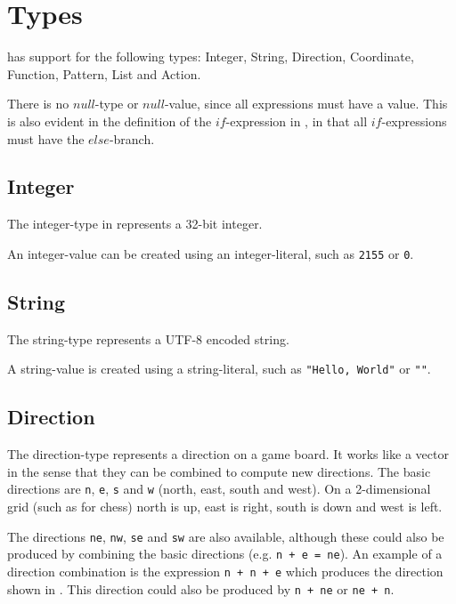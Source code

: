 \section{Types}
\label{sec:types}

\productname{} has support for the following types: Integer, String, Direction, Coordinate,
Function, Pattern, List and Action.

There is no $null$-type or $null$-value, since all expressions must have a value. This
is also evident in the definition of the $if$-expression in , in that
all $if$-expressions must have the $else$-branch.

\subsection{Integer}
The integer-type in \productname{} represents a 32-bit integer.

An integer-value can be created using an integer-literal, such as \texttt{2155} or \texttt{0}.

\subsection{String}
The string-type represents a UTF-8 encoded string.

A string-value is created using a string-literal, such as \texttt{"Hello, World"} or \texttt{""}.

\subsection{Direction}
The direction-type represents a direction on a game board. It works like a vector
in the sense that they can be combined to compute new directions. The basic directions
are \texttt{n}, \texttt{e}, \texttt{s} and \texttt{w} (north, east, south and west).
On a 2-dimensional grid (such as for chess) north is up, east is right, south is down and 
west is left.

The directions \texttt{ne}, \texttt{nw},
\texttt{se} and \texttt{sw} are also available, although these could also be produced
by combining the basic directions (e.g. \texttt{n + e = ne}). An example of a direction combination is the
expression \texttt{n + n + e} which produces
the direction shown in . This direction could also be produced by
\texttt{n + ne} or \texttt{ne + n}.


